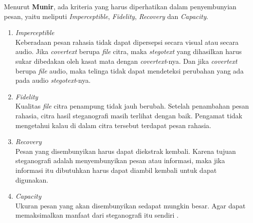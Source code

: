 	Menurut \textbf{Munir}, ada kriteria yang harus diperhatikan dalam penyembunyian pesan, yaitu meliputi \emph{Imperceptible}, \emph{Fidelity}, \emph{Recovery} dan \emph{Capacity}.
	\begin{enumerate}
		\item \emph{Imperceptible}\\ 
		Keberadaan pesan rahasia tidak dapat dipersepsi secara visual atau secara audio. Jika \emph{covertext} berupa \emph{file} citra, maka \emph{stegotext} yang dihasilkan harus sukar dibedakan oleh kasat mata dengan \emph{covertext}-nya. Dan jika \emph{covertext} berupa \emph{file} audio, maka telinga tidak dapat mendeteksi perubahan yang ada pada audio \emph{stegotext}-nya. 
		\item \emph{Fidelity}\\
		Kualitas \emph{file} citra penampung tidak jauh berubah. Setelah penambahan pesan rahasia, citra hasil steganografi masih terlihat dengan baik. Pengamat tidak mengetahui kalau di dalam citra tersebut terdapat pesan rahasia.
		\item \emph{Recovery}\\
		Pesan yang disembunyikan harus dapat diekstrak kembali. Karena tujuan steganografi adalah menyembunyikan pesan atau informasi, maka jika informasi itu dibutuhkan harus dapat diambil kembali untuk dapat digunakan.
		\item \emph{Capacity}\\
		Ukuran pesan yang akan disembunyikan sedapat mungkin besar. Agar dapat memaksimalkan manfaat dari steganografi itu sendiri \cite{munir}.
	\end{enumerate}
	
